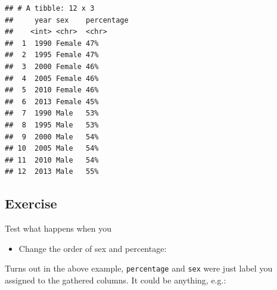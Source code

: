 \documentclass[]{book}
\makeatletter
\newenvironment{Shaded}{\begin{snugshade}}{\end{snugshade}}
\newcommand{\KeywordTok}[1]{\textcolor[rgb]{0.13,0.29,0.53}{\textbf{#1}}}
\newcommand{\StringTok}[1]{\textcolor[rgb]{0.31,0.60,0.02}{#1}}
\newcommand{\OperatorTok}[1]{\textcolor[rgb]{0.81,0.36,0.00}{\textbf{#1}}}
\newcommand{\NormalTok}[1]{#1}
\providecommand{\tightlist}{%
  \setlength{\itemsep}{0pt}\setlength{\parskip}{0pt}}
\newenvironment{kframe}{%
\medskip{}
\setlength{\fboxsep}{.8em}
 \def\at@end@of@kframe{}%
 \ifinner\ifhmode%
  \def\at@end@of@kframe{\end{minipage}}%
  \begin{minipage}{\columnwidth}%
 \fi\fi%
 \def\FrameCommand##1{\hskip\@totalleftmargin \hskip-\fboxsep
 \colorbox{shadecolor}{##1}\hskip-\fboxsep
     \hskip-\linewidth \hskip-\@totalleftmargin \hskip\columnwidth}%
 \MakeFramed {\advance\hsize-\width
   \@totalleftmargin\z@ \linewidth\hsize
   \@setminipage}}%
 {\par\unskip\endMakeFramed%
 \at@end@of@kframe}
\renewenvironment{Shaded}{\begin{kframe}}{\end{kframe}}
\makeatother
\begin{document}
\begin{Shaded}
\end{Shaded}

\begin{verbatim}
## # A tibble: 12 x 3
##     year sex    percentage
##    <int> <chr>  <chr>     
##  1  1990 Female 47%       
##  2  1995 Female 47%       
##  3  2000 Female 46%       
##  4  2005 Female 46%       
##  5  2010 Female 46%       
##  6  2013 Female 45%       
##  7  1990 Male   53%       
##  8  1995 Male   53%       
##  9  2000 Male   54%       
## 10  2005 Male   54%       
## 11  2010 Male   54%       
## 12  2013 Male   55%
\end{verbatim}

\subsection{Exercise}\label{exercise-20}

Test what happens when you

\begin{itemize}
\tightlist
\item
  Change the order of sex and percentage:
\end{itemize}

\begin{Shaded}
\end{Shaded}

Turns out in the above example, \texttt{percentage} and \texttt{sex}
were just label you assigned to the gathered columns. It could be
anything, e.g.:

\begin{Shaded}
\end{Shaded}
\end{document}
